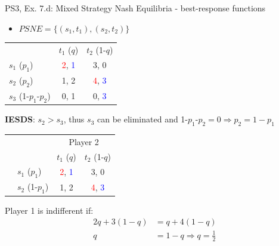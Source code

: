 \begin{frame}{PS3, Ex. 7.d: Mixed Strategy Nash Equilibria - best-response functions}
  \begin{multicols}{2}
    \begin{itemize}
      \item[(d)] $PSNE=\{(s_1,t_1),(s_2,t_2)\}$
    \end{itemize}
    \vspace{-10pt}
    \begin{table}
      \begin{tabular}{l|c|c|}
          \multicolumn{1}{c}{}  & \multicolumn{1}{c}{$t_1$ ($q$)} & \multicolumn{1}{c}{$t_2$ (1-$q$)} \\\cline{2-3}
          $s_1$ ($p_1$)         & \textcolor{red}{2}, \textcolor{blue}{1} & 3, 0 \\\cline{2-3}
          $s_2$ ($p_2$)         & 1, 2 & \textcolor{red}{4}, \textcolor{blue}{3} \\\cline{2-3}
          $s_3$ (1-$p_1$-$p_2$) & 0, 1 & 0, \textcolor{blue}{3} \\\cline{2-3}
      \end{tabular}
    \end{table}
    \vspace{-4pt}
    \textbf{IESDS}: $s_2>s_3$, thus $s_3$ can be eliminated and 1-$p_1$-$p_2=0\Rightarrow p_2=1-p_1$
    \vspace{-6pt}
    \begin{table}
      \begin{tabular}{cl|c|c|}
        & \multicolumn{1}{c}{} & \multicolumn{2}{c}{\color{blue}Player 2}\\
        \parbox[t]{1mm}{}
        &   &  &  \\
        & $s_1$ ($p_1$)  & \textcolor{red}{2}, \textcolor{blue}{1} & 3, 0 \\
        & $s_2$ (1-$p_1$)& 1, 2 & \textcolor{red}{4}, \textcolor{blue}{3} \\
      \end{tabular}
    \end{table}
    \vspace{-2pt}
    Player 1 is indifferent if:
    \vspace{-4pt}
    \begin{align*}
      2q+3(1-q) &= q+4(1-q) \\
      q &= 1-q \Rightarrow q = \frac{1}{2}

\end{align*}
\end{multicols}
\end{frame}
